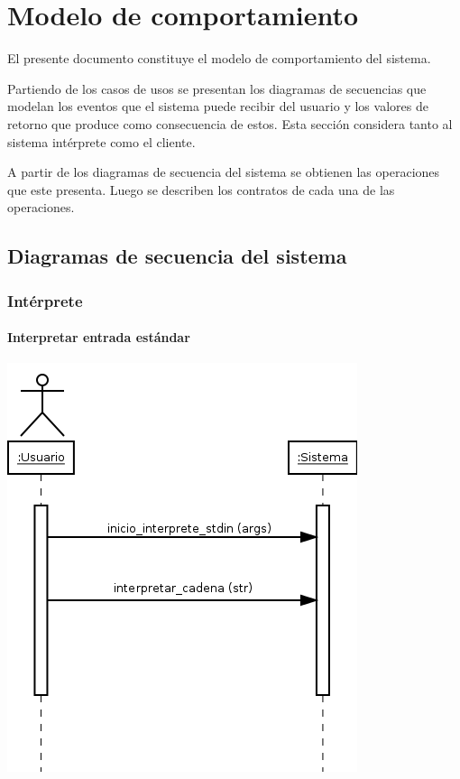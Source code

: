\section{Modelo de comportamiento}
El presente documento constituye el modelo de comportamiento del sistema.

Partiendo de los casos de usos se presentan los diagramas de secuencias que modelan 
los eventos que el sistema puede recibir del usuario y los valores de retorno
que produce como consecuencia de estos.  Esta sección considera tanto al sistema intérprete
como el cliente.

A partir de los diagramas de secuencia del sistema se obtienen las operaciones 
que este presenta. Luego se describen los contratos de cada una de las operaciones.  
\subsection{Diagramas de secuencia del sistema}
\subsubsection{Intérprete}
\paragraph{Interpretar entrada estándar}
\begin{center}
\includegraphics[scale=0.4]{interpretar_stdin.png} \\
\end{center}

